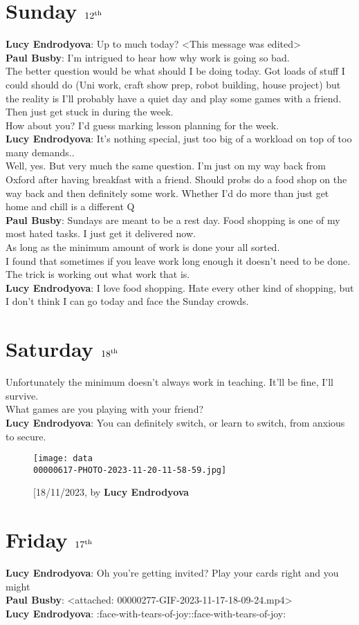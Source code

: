 \section*{Sunday $12\textsuperscript{th}$}
\textbf{Lucy  Endrodyova}: Up to much today? <This message was edited>\\
\textbf{Paul Busby}: I’m intrigued to hear how \/ why work is going so bad.\\
The better question would be what should I be doing today. Got loads of stuff I could \/ should do  (Uni work, craft show prep, robot building, house project) but the reality is I’ll probably have a quiet day and play some games with a friend. Then just get stuck in during the week.\\How about you? I’d guess marking \/ lesson planning for the week.\\\textbf{Lucy  Endrodyova}: It's nothing special, just too big of a workload on top of too many demands..\\
Well, yes. But very much the same question. I'm just on my way back from Oxford after having breakfast with a friend. Should probs do a food shop on the way back and then definitely some work. Whether I'd do more than just get home and chill is a different Q\\\textbf{Paul Busby}: Sundays are meant to be a rest day. Food shopping is one of my most hated tasks. I just get it delivered now.\\
As long as the minimum amount of work is done your all sorted.\\I found that sometimes if you leave work long enough it doesn’t need to be done. The trick is working out what work that is.\\\textbf{Lucy  Endrodyova}: I love food shopping. Hate every other kind of shopping, but I don't think I can go today and face the Sunday crowds.\\
\section*{Saturday $18\textsuperscript{th}$}
Unfortunately the minimum doesn't always work in teaching. It'll be fine, I'll survive.\\What games are you playing with your friend?\\\textbf{Lucy  Endrodyova}: You can definitely switch, or learn to switch, from anxious to secure.\\
\begin{figure}[htp]
	\centering
	\texttt{[image: data\\00000617-PHOTO-2023-11-20-11-58-59.jpg]}
	\caption{{\footnotesize[18/11/2023, by \textbf{Lucy  Endrodyova}}}
\end{figure}

\section*{Friday $17\textsuperscript{th}$}
\textbf{Lucy  Endrodyova}: Oh you're getting invited? Play your cards right and you might\\
\textbf{Paul Busby}: <attached: 00000277-GIF-2023-11-17-18-09-24.mp4>\\
\textbf{Lucy  Endrodyova}: :face-with-tears-of-joy::face-with-tears-of-joy:\\

